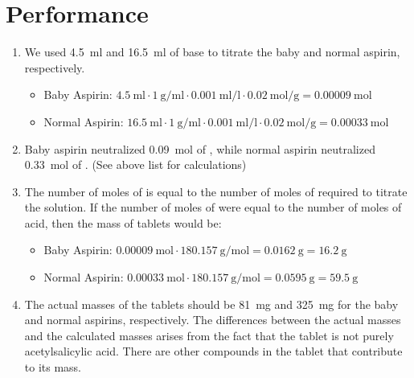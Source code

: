 \documentclass[a4paper]{article}
\begin{document}
    \section{Performance}
        \begin{enumerate}
            \item We used \SI{4.5}{\ml} and \SI{16.5}{\ml} of base to titrate the baby and normal aspirin, respectively.
            \begin{itemize}
                \item Baby Aspirin: $\SI{4.5}{\ml}\cdot\SI{1}{\g\per\ml}\cdot\SI{0.001}{\ml\per\l}\cdot\SI{0.02}{\mol\per\g}=\SI{0.00009}{\mol}$
                \item Normal Aspirin: $\SI{16.5}{\ml}\cdot\SI{1}{\g\per\ml}\cdot\SI{0.001}{\ml\per\l}\cdot\SI{0.02}{\mol\per\g}=\SI{0.00033}{\mol}$
            \end{itemize}
            \item Baby aspirin neutralized \SI{0.09}{\mol} of , while normal aspirin neutralized \SI{0.33}{\mol}
            of . (See above list for calculations)
            \item The number of moles of  is equal to the number of moles of  required to titrate the
            solution. If the number of moles of  were equal to the number of moles of acid, then the mass of 
            tablets would be:
            \begin{itemize}
                \item Baby Aspirin: $\SI{0.00009}{\mol}\cdot\SI{180.157}{\g\per\mol}=\SI{0.0162}{\g}=\SI{16.2}{\g}$
                \item Normal Aspirin: $\SI{0.00033}{\mol}\cdot\SI{180.157}{\g\per\mol}=\SI{0.0595}{\g}=\SI{59.5}{\g}$
            \end{itemize}
            \item The actual masses of the tablets should be \SI{81}{\mg} and \SI{325}{\mg} for the baby and normal aspirins,
            respectively. The differences between the actual masses and the calculated masses arises from the fact that
            the tablet is not purely acetylsalicylic acid. There are other compounds in the tablet that contribute to its
            mass.
        \end{enumerate}
\end{document}

